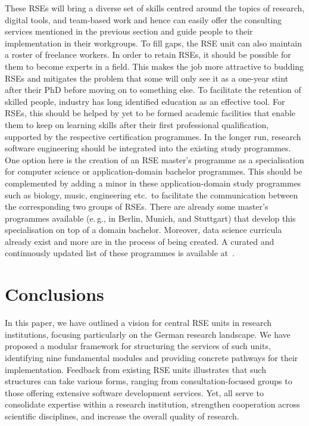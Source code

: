 \documentclass[a4paper]{article}
\newcommand*{\eg}{e.\,g.,\xspace}
\begin{document}
These RSEs will bring a diverse set of skills centred around the topics of research,
  digital tools, and team-based work and hence can easily offer the consulting services mentioned in the previous section and guide people to their implementation in their workgroups.
To fill gaps, the RSE unit can also maintain a roster of freelance workers.
In order to retain RSEs, it should be possible for them to become experts in a field.
This makes the job more attractive to budding RSEs and mitigates the problem that some will only see it as a one-year stint after their PhD before moving on to something else.
To facilitate the retention of skilled people, industry has long identified education as an effective tool.
For RSEs, this should be helped by yet to be formed academic facilities that enable them to keep on learning skills after their first professional qualification, supported by the respective certification programmes.
In the longer run, research software engineering should be integrated into the existing study programmes.
One option here is the creation of an RSE master's programme as a specialisation for computer science or application-domain bachelor programmes.
This should be complemented by adding a minor in these application-domain study programmes such as biology, music, engineering etc.\ to facilitate the communication between the corresponding two groups of RSEs.
There are already some master's programmes available (\eg{} in Berlin, Munich, and Stuttgart) that develop this specialisation on top of a domain bachelor.
Moreover, data science curricula already exist and more are in the process of being created.
A curated and continuously updated list of these programmes is available at~\cite{learnandteachlearn}.

\section{Conclusions}
\label{sec:conclusions}

In this paper, we have outlined a vision for central RSE units in research institutions, focusing particularly on the German research landscape.
We have proposed a modular framework for structuring the services of such units, identifying nine fundamental modules and providing concrete pathways for their implementation.
Feedback from existing RSE units illustrates that such structures can take various forms, ranging from consultation-focused groups to those offering extensive software development services.
Yet, all serve to consolidate expertise within a research institution, strengthen cooperation across scientific disciplines, and increase the overall quality of research.
\end{document}
